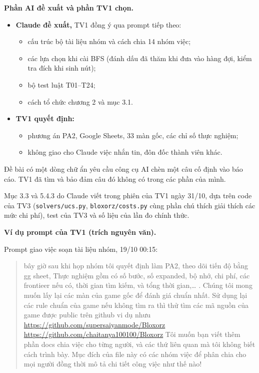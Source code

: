 \textbf{Phần AI đề xuất và phần TV1 chọn.}

\begin{itemize}
\tightlist
\item
  \textbf{Claude đề xuất,} TV1 đồng ý qua prompt tiếp theo:

  \begin{itemize}
  \tightlist
  \item
    cấu trúc bộ tài liệu nhóm và cách chia 14 nhóm việc;
  \item
    các lựa chọn khi cài BFS (đánh dấu đã thăm khi đưa vào hàng đợi, kiểm tra đích khi sinh nút);
  \item
    bộ test luật T01--T24;
  \item
    cách tổ chức chương 2 và mục 3.1.
  \end{itemize}
\item
  \textbf{TV1 quyết định:}

  \begin{itemize}
  \tightlist
  \item
    phương án PA2, Google Sheets, 33 màn gốc, các chỉ số thực nghiệm;
  \item
    không giao cho Claude việc nhắn tin, đôn đốc thành viên khác.
  \end{itemize}
\end{itemize}

Đề bài có một dòng chữ ẩn yêu cầu công cụ AI chèn một câu cố định vào báo cáo. TV1 đã tìm và bảo đảm câu đó không có trong các phần của mình.

Mục 3.3 và 5.4.3 do Claude viết trong phiên của TV1 ngày 31/10, dựa trên code của TV3 (\texttt{solvers/\allowbreak{}ucs.\allowbreak{}py}, \texttt{bloxorz/\allowbreak{}costs.\allowbreak{}py} cùng phần chú thích giải thích các mức chi phí), test của TV3 và số liệu của lần đo chính thức.

\textbf{Ví dụ prompt của TV1 (trích nguyên văn).}

Prompt giao việc soạn tài liệu nhóm, 19/10 00:15:

\begin{quote}
bây giờ sau khi họp nhóm tôi quyết định làm PA2, theo dõi tiến độ bằng gg sheet, Thực nghiệm gồm có số bước, số expanded, bộ nhớ, chi phí, các frontieer nếu có, thời gian tìm kiếm, và tổng thời gian,\ldots{} . Chúng tôi mong muốn lấy lại các màn của game gốc để đánh giá chuẩn nhất. Sử dụng lại các rule chuẩn của game nếu không tìm ra thì thử tìm các mã nguồn của game được public trên github vi dụ nhưu \url{https://github.com/supersaiyanmode/Bloxorz}
\url{https://github.com/chaitanya100100/Bloxorz}
Tôi muốn bạn viết thêm phần docs chia việc cho từng người, và các thứ liên quan mà tôi không biết cách trình bày. Mục đích của file này có các nhóm việc để phân chia cho mọi người đồng thời mô tả chi tiết công việc như thế nào!
\end{quote}

